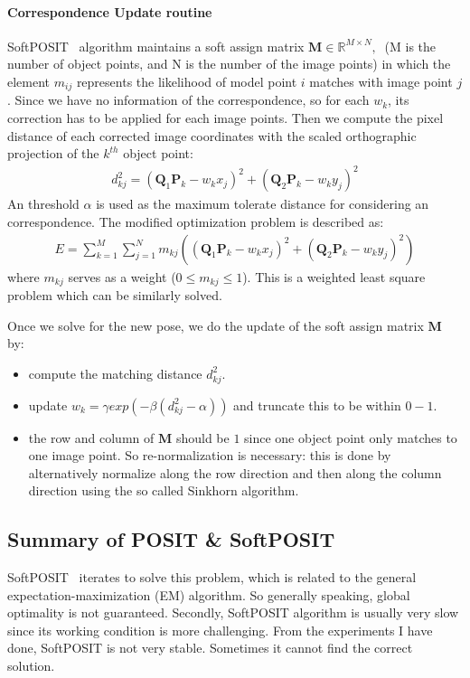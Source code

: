 \documentclass[a4paper]{report}
\begin{document}
\paragraph{Correspondence Update routine}
SoftPOSIT~\cite{softposit} algorithm maintains a soft assign matrix $\mathbf{M} \in \mathbb{R}^{M\times N},\ $ (M is the number of object points, and N is the number of the image points) in which the element $m_{ij}$ represents the likelihood of model point $i$ matches with image point $j$. Since we have no information of the correspondence, so for each $w_k$, its correction has to be applied for each image points. Then we compute the pixel distance of each corrected image coordinates with the scaled orthographic projection of the $k^{th}$ object point:
\begin{align*}
d_{kj}^2=(\mathbf{Q}_1\mathbf{P}_k-w_k x_j)^2 + (\mathbf{Q}_2\mathbf{P}_k-w_k y_j)^2
\end{align*}
An threshold $\alpha$ is used as the maximum tolerate distance for considering an correspondence. The modified optimization problem is described as:
\begin{align*}
E=\sum_{k=1}^{M}\sum_{j=1}^{N}m_{kj}\left(
\left(
\mathbf{Q}_1\mathbf{P}_k-w_k x_j
\right)^2+
\left(
\mathbf{Q}_2\mathbf{P}_k-w_k y_j
\right)^2
\right)
\end{align*}
where $m_{kj}$ serves as a weight ($0 \leq m_{kj} \leq 1$). This is a weighted least square problem which can be similarly solved. 

Once we solve for the new pose, we do the update of the soft assign matrix $\mathbf{M}$ by:
\begin{itemize}
	\item compute the matching distance $d_{kj}^2$.
	\item update $w_k=\gamma exp(-\beta(d_{kj}^2-\alpha))$ and truncate this to be within $0-1$.
	\item the row and column of $\mathbf{M}$ should be $1$ since one object point only matches to one image point. So re-normalization is necessary: this is done by alternatively normalize along the row direction and then along the column direction using the so called Sinkhorn algorithm.
\end{itemize}

\subsection{Summary of POSIT \& SoftPOSIT}
SoftPOSIT~\cite{softposit} iterates to solve this problem, which is related to the general expectation-maximization (EM) algorithm. So generally speaking, global optimality is not guaranteed. Secondly, SoftPOSIT algorithm is usually very slow since its working condition is more challenging. From the experiments I have done, SoftPOSIT is not very stable. Sometimes it cannot find the correct solution.
\end{document}
